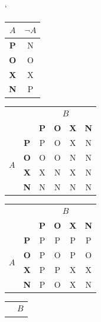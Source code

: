 \documentclass[a4paper, 11pt]{article}
\begin{document}
\begin{table}[ht]
    \catcode`
    \begin{center}
        \begin{tabular}{| c | c |} \hline
            $A$         & $\neg A$ \\ \hline
            \textbf{P} & N \\ \hline
            \textbf{O} & O \\ \hline
            \textbf{X} & X \\ \hline
            \textbf{N} & P \\ \hline
        \end{tabular}
        \begin{tabular}{| c  c | c | c | c | c |} \hline
            \multicolumn{2}{|c|}{ \multirow{2}{*}{$A \wedge B$} } & \multicolumn{4}{c|}{$B$}\\ \cline{3-6}
            & & \textbf{P} & \textbf{O} & \textbf{X} & \textbf{N} \\ \hline
            \multirow{4}{*}{$A$} & \multicolumn{1}{|c|}{\textbf{P}} & P & O & X & N \\ \cline{2-6}
            & \multicolumn{1}{|c|}{\textbf{O}} & O & O & N & N \\ \cline{2-6}
            & \multicolumn{1}{|c|}{\textbf{X}} & X & N & X & N \\ \cline{2-6}
            & \multicolumn{1}{|c|}{\textbf{N}} & N & N & N & N \\ \hline
        \end{tabular}
        \begin{tabular}{| c  c | c | c | c | c |} \hline
            \multicolumn{2}{|c|}{ \multirow{2}{*}{$A \vee B$} } & \multicolumn{4}{c|}{$B$}\\ \cline{3-6}
            & & \textbf{P} & \textbf{O} & \textbf{X} & \textbf{N} \\ \hline
            \multirow{4}{*}{$A$} & \multicolumn{1}{|c|}{\textbf{P}} & P & P & P & P \\ \cline{2-6}
            & \multicolumn{1}{|c|}{\textbf{O}} & P & O & P & O \\ \cline{2-6}
            & \multicolumn{1}{|c|}{\textbf{X}} & P & P & X & X \\ \cline{2-6}
            & \multicolumn{1}{|c|}{\textbf{N}} & P & O & X & N \\ \hline
        \end{tabular}  
        \begin{tabular}{| c  c | c | c | c | c |} \hline
            \multicolumn{2}{|c|}{ \multirow{2}{*}{$A \rightarrow B$} } & \multicolumn{4}{c|}{$B$}\\ \cline{3-6}

\end{tabular}
\end{center}
\end{table}
\end{document}
